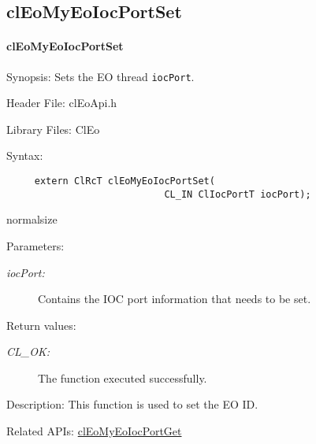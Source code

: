 \begin{flushleft}
  \newpage
\subsection{clEoMyEoIocPortSet}
\hypertarget{pageeo116}{}\paragraph{cl\-Eo\-My\-Eo\-Ioc\-Port\-Set}\label{pageeo116}
\begin{Desc}
\item[Synopsis:]Sets the EO thread {\tt{iocPort}}.\end{Desc}
\begin{Desc}
\item[Header File:]clEoApi.h\end{Desc}
\begin{Desc}
\item[Library Files:]Cl\-Eo\end{Desc}
\begin{Desc}
\item[Syntax:]

\footnotesize\begin{verbatim}     extern ClRcT clEoMyEoIocPortSet(
                 			CL_IN ClIocPortT iocPort);
\end{verbatim}
  normalsize
\end{Desc}
\begin{Desc}
\item[Parameters:]
\begin{description}
\item[{\em ioc\-Port:}]Contains the IOC port information that needs to be set.\end{description}
\end{Desc}
\begin{Desc}
\item[Return values:]
\begin{description}
\item[{\em CL\_\-OK:}]The function executed successfully.\end{description}
\end{Desc}
\begin{Desc}
\item[Description:]This function is used to set the EO ID.\end{Desc}
\begin{Desc}
\item[Related APIs:]\hyperlink{pageeo117}{cl\-Eo\-My\-Eo\-Ioc\-Port\-Get} \end{Desc}





\end{flushleft}
